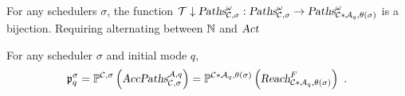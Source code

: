 \begin{lemma}
For any schedulers $\sigma$, the function 
$
    \project{\pfunc}{\infpaths{\pta,\sigma}} 
    : 
    \infpaths{\pta,\sigma} 
    \rightarrow
    \infpaths{\productmdp{\pta}{\dta_q}, \sfunc(\sigma)}
$ 
is a bijection.
{\color{red} Requiring alternating between $\Nset$ and $\acts$}
\end{lemma}

\begin{theorem}
For any scheduler $\sigma$ and initial mode $q$,
\[
    \pr
        {\dtloc}
        {\sigma}
        =
            \probm
                ^{\pta,\sigma}
                \left(
                    \LangCsAqF
                \right)
        =
            \probm
                ^{\productmdp{\pta}{\dta_\dtloc},\theta(\sigma)}
                \left(
                    \omgpaths{\productmdp{\pta}{\dta_\dtloc},\theta\left(\sigma\right)}{F}
                \right) 
    ~. 
\]
\end{theorem}